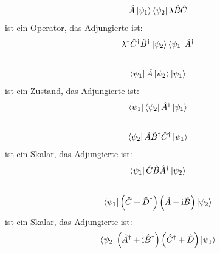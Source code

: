 \documentclass[11pt, ngerman, fleqn, DIV=15, headinclude]{scrartcl}
\begin{document}
\subsection{}
\begin{align*}
	\hat{A}\ket{\psi_1}\bra{\psi_2}\lambda\hat{B}\hat{C}
\end{align*}
ist ein Operator, das Adjungierte ist:
\begin{align*}
	\lambda^*\hat{C}^{\dagger}\hat{B}^{\dagger}\ket{\psi_2}\bra{\psi_1}\hat{A}^{\dagger}
\end{align*}

\subsection{}
\begin{align*}
	\bra{\psi_1}\hat{A}\ket{\psi_2}\ket{\psi_1}
\end{align*}
ist ein Zustand, das Adjungierte ist:
\begin{align*}
	\bra{\psi_1}\bra{\psi_2}\hat{A}^{\dagger}\ket{\psi_1}
\end{align*}

\subsection{}
\begin{align*}
	\bra{\psi_2}\hat{A}\hat{B}^{\dagger}\hat{C}^{\dagger}\ket{\psi_1}
\end{align*}
ist ein Skalar, das Adjungierte ist:
\begin{align*}
	\bra{\psi_1}\hat{C}\hat{B}\hat{A}^{\dagger}\ket{\psi_2}
\end{align*}

\subsection{}
\begin{align*}
	\bra{\psi_1}\left( \hat{C}+\hat{D}^{\dagger} \right)\left( \hat{A}-\mathrm i\hat{B} \right)\ket{\psi_2}
\end{align*}
ist ein Skalar, das Adjungierte ist:
\begin{align*}
	\bra{\psi_2}\left( \hat{A}^{\dagger}+\mathrm i\hat{B}^{\dagger} \right)\left( \hat{C}^{\dagger}+\hat{D} \right)\ket{\psi_1}
\end{align*}
\end{document}
